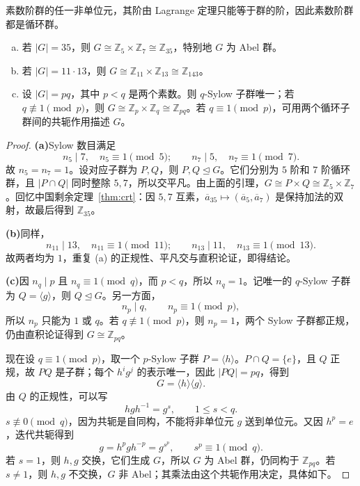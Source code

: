 \documentclass[lang=cn,a4paper,fontset=none,zihao=false,10pt,openany,twoside]{beautybook}
\numberwithin{algorithm}{chapter}
\begin{document}
素数阶群的任一非单位元，其阶由 Lagrange 定理只能等于群的阶，因此素数阶群都是循环群。

\begin{example}[两个素数乘积阶的群]
\begin{enumerate}[(a)]
\item 若 $|G|=35$，则 $G\cong\mathbb Z_5\times\mathbb Z_7\cong\mathbb Z_{35}$，特别地 $G$ 为 Abel 群。
\item 若 $|G|=11\cdot13$，则 $G\cong\mathbb Z_{11}\times\mathbb Z_{13}\cong\mathbb Z_{143}$。
\item 设 $|G|=pq$，其中 $p<q$ 是两个素数。则 $q$-Sylow 子群唯一；若 $q\not\equiv1\pmod p$，则 $G\cong\mathbb Z_p\times\mathbb Z_q\cong\mathbb Z_{pq}$。若 $q\equiv1\pmod p$，可用两个循环子群间的共轭作用描述 $G$。
\end{enumerate}
\end{example}
\begin{proof}
\par\smallskip\noindent\textbf{(a)}\quad Sylow 数目满足
\[
 n_5\mid7,\quad n_5\equiv1\pmod5;
 \qquad n_7\mid5,\quad n_7\equiv1\pmod7.
\]
故 $n_5=n_7=1$。设对应子群为 $P,Q$，则 $P,Q\trianglelefteq G$。它们分别为 $5$ 阶和 $7$ 阶循环群，且 $|P\cap Q|$ 同时整除 $5,7$，所以交平凡。由上面的引理，$G\cong P\times Q\cong\mathbb Z_5\times\mathbb Z_7$。回忆中国剩余定理~\ref{thm:crt}：因 $5,7$ 互素，$\overline a_{35}\mapsto(\overline a_5,\overline a_7)$ 是保持加法的双射，故最后得到 $\mathbb Z_{35}$。

\par\smallskip\noindent\textbf{(b)}\quad 同样，
\[
 n_{11}\mid13,\quad n_{11}\equiv1\pmod{11};
 \qquad n_{13}\mid11,\quad n_{13}\equiv1\pmod{13}.
\]
故两者均为 $1$，重复 (a) 的正规性、平凡交与直积论证，即得结论。

\par\smallskip\noindent\textbf{(c)}\quad 因 $n_q\mid p$ 且 $n_q\equiv1\pmod q$，而 $p<q$，所以 $n_q=1$。记唯一的 $q$-Sylow 子群为 $Q=\langle g\rangle$，则 $Q\trianglelefteq G$。另一方面，
\[
 n_p\mid q,\qquad n_p\equiv1\pmod p,
\]
所以 $n_p$ 只能为 $1$ 或 $q$。若 $q\not\equiv1\pmod p$，则 $n_p=1$，两个 Sylow 子群都正规，仍由直积论证得到 $G\cong\mathbb Z_{pq}$。

现在设 $q\equiv1\pmod p$，取一个 $p$-Sylow 子群 $P=\langle h\rangle$。$P\cap Q=\{e\}$，且 $Q$ 正规，故 $PQ$ 是子群；每个 $h^ig^j$ 的表示唯一，因此 $|PQ|=pq$，得到
\[
 G=\langle h\rangle\langle g\rangle.
\]
由 $Q$ 的正规性，可以写
\[
 hgh^{-1}=g^s,\qquad 1\le s<q.
\]
$s\not\equiv0\pmod q$，因为共轭是自同构，不能将非单位元 $g$ 送到单位元。又因 $h^p=e$，迭代共轭得到
\[
 g=h^pgh^{-p}=g^{s^p},\qquad s^p\equiv1\pmod q.
\]
若 $s=1$，则 $h,g$ 交换，它们生成 $G$，所以 $G$ 为 Abel 群，仍同构于 $\mathbb Z_{pq}$。若 $s\ne1$，则 $h,g$ 不交换，$G$ 非 Abel；其乘法由这个共轭作用决定，具体如下。
\end{proof}
\end{document}
